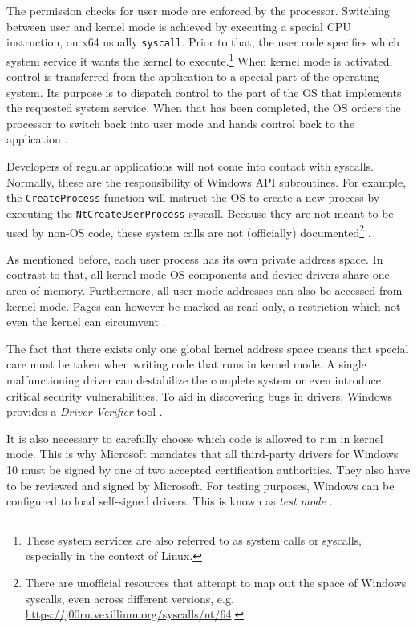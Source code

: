 The permission checks for user mode are enforced by the processor. Switching between user and kernel mode is achieved by executing a special CPU instruction, on x64 usually \texttt{syscall}. Prior to that, the user code specifies which system service it wants the kernel to execute.\footnote{\label{fn:background.kerneldriver.syscalls} These system services are also referred to as system calls or syscalls, especially in the context of Linux.} When kernel mode is activated, control is transferred from the application to a special part of the operating system. Its purpose is to dispatch control to the part of the OS that implements the requested system service. When that has been completed, the OS orders the processor to switch back into user mode and hands control back to the application \cite{Yosifovich2017}.

Developers of regular applications will not come into contact with syscalls. Normally, these are the responsibility of Windows API subroutines. For example, the \texttt{CreateProcess} function will instruct the OS to create a new process by executing the \texttt{NtCreateUserProcess} syscall. Because they are not meant to be used by non-OS code, these system calls are not (officially) documented\footnote{\label{fn:background.kerneldriver.syscalldoc} There are unofficial resources that attempt to map out the space of Windows syscalls, even across different versions, e.g. \url{https://j00ru.vexillium.org/syscalls/nt/64}.} \cite{Yosifovich2017}.

As mentioned before, each user process has its own private address space. In contrast to that, all kernel-mode OS components and device drivers share one area of memory. Furthermore, all user mode addresses can also be accessed from kernel mode. Pages can however be marked as read-only, a restriction which not even the kernel can circumvent \cite{Yosifovich2017}.

The fact that there exists only one global kernel address space means that special care must be taken when writing code that runs in kernel mode. A single malfunctioning driver can destabilize the complete system or even introduce critical security vulnerabilities. To aid in discovering bugs in drivers, Windows provides a \emph{Driver Verifier} tool \cite{Yosifovich2017}.

It is also necessary to carefully choose which code is allowed to run in kernel mode. This is why Microsoft mandates that all third-party drivers for Windows 10 must be signed by one of two accepted certification authorities. They also have to be reviewed and signed by Microsoft. For testing purposes, Windows can be configured to load self-signed drivers. This is known as \emph{test mode} \cite{Yosifovich2017}.

